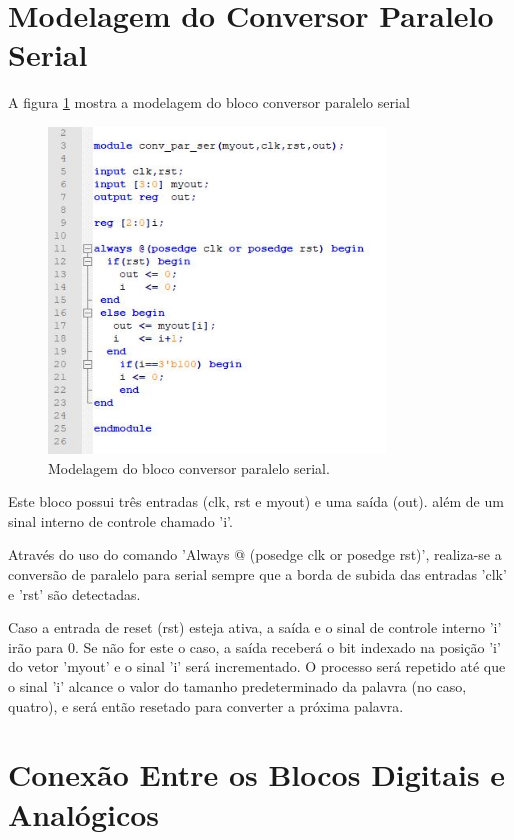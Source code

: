 \section{Modelagem do Conversor Paralelo Serial}

A figura \ref{verilogPS} mostra a modelagem do bloco conversor paralelo serial

\begin{figure}[ht!]
  \centering
  \includegraphics[width=0.8\textwidth]{figuras/verilogPS.JPG}
  \caption{Modelagem do bloco conversor paralelo serial.}
  \label{verilogPS}
\end{figure}

Este bloco possui três entradas (clk, rst e myout) e uma saída (out). além de um sinal interno de controle chamado 'i'.

Através do uso do comando 'Always @ (posedge clk or posedge rst)', realiza-se a conversão de paralelo para serial sempre que a borda de subida das entradas 'clk' e 'rst' são detectadas.

Caso a entrada de reset (rst) esteja ativa, a saída e o sinal de controle interno 'i' irão para 0. Se não for este o caso, a saída receberá o bit indexado na posição 'i' do vetor 'myout' e o sinal 'i' será incrementado. O processo será repetido até que o sinal 'i' alcance o valor do tamanho predeterminado da palavra (no caso, quatro), e será então resetado para converter a próxima palavra.

\section{Conexão Entre os Blocos Digitais e Analógicos}

